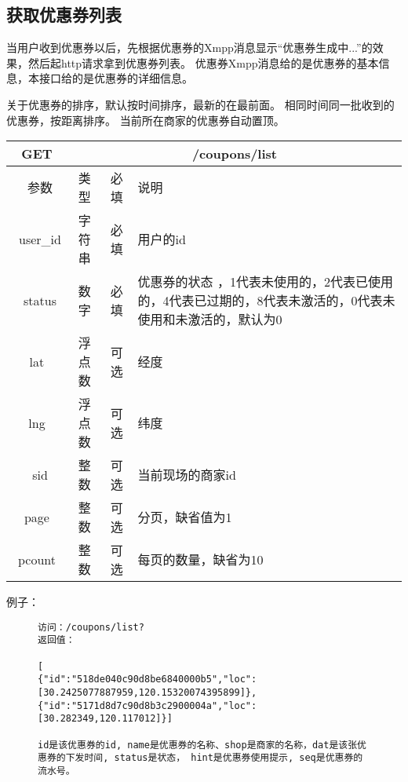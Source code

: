 \subsection{获取优惠券列表}
当用户收到优惠券以后，先根据优惠券的Xmpp消息显示“优惠券生成中...”的效果，然后起http请求拿到优惠券列表。
优惠券Xmpp消息给的是优惠券的基本信息，本接口给的是优惠券的详细信息。

关于优惠券的排序，默认按时间排序，最新的在最前面。
相同时间同一批收到的优惠券，按距离排序。
当前所在商家的优惠券自动置顶。

\begin{table}[H]
   \begin{center}
\begin{tabular}{|c|c|c|p{12cm}|}
\hline
GET & \multicolumn{3}{|c|}{/coupons/list} \\
\hline\hline
 \  参数  & 类型 & 必填 &  说明  \\
\hline
 \  user\_id  & 字符串 & 必填 &  用户的id  \\
\hline
 \  status  & 数字 & 必填 &  优惠券的状态 ，1代表未使用的，2代表已使用的，4代表已过期的，8代表未激活的，0代表未使用和未激活的，默认为0\\
\hline
 lat  & 浮点数 & 可选 & 经度\\
\hline
 lng  &  浮点数 & 可选 & 纬度\\ 
 \hline
 \ sid  &  整数 & 可选 & 当前现场的商家id\\ 
  \hline
 page  & 整数 & 可选 & 分页，缺省值为1\\ 
 \hline
 pcount  & 整数 & 可选 & 每页的数量，缺省为10\\ 
\hline
\end{tabular}
   \end{center}
\end{table}


例子：

\begin{figure}[H]
\begin{verbatim}
访问：/coupons/list?
返回值：

[
{"id":"518de040c90d8be6840000b5","loc":[30.2425077887959,120.15320074395899]},
{"id":"5171d8d7c90d8b3c2900004a","loc":[30.282349,120.117012]}]

id是该优惠券的id, name是优惠券的名称、shop是商家的名称，dat是该张优惠券的下发时间, status是状态， hint是优惠券使用提示, seq是优惠券的流水号。
 
\end{verbatim}
\end{figure}





